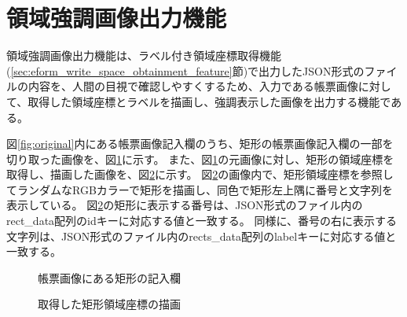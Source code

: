 \section{領域強調画像出力機能}\label{sec:highlighted_area_image_output}
領域強調画像出力機能は、ラベル付き領域座標取得機能(\ref{sec:eform_write_space_obtainment_feature}節)で出力したJSON形式のファイルの内容を、人間の目視で確認しやすくするため、入力である帳票画像に対して、取得した領域座標とラベルを描画し、強調表示した画像を出力する機能である。

図\ref{fig:original}内にある帳票画像記入欄のうち、矩形の帳票画像記入欄の一部を切り取った画像を、図\ref{fig:rect_original}に示す。
また、図\ref{fig:rect_original}の元画像に対し、矩形の領域座標を取得し、描画した画像を、図\ref{fig:rect_drawing}に示す。
図\ref{fig:rect_drawing}の画像内で、矩形領域座標を参照してランダムなRGBカラーで矩形を描画し、同色で矩形左上隅に番号と文字列を表示している。
図\ref{fig:rect_drawing}の矩形に表示する番号は、JSON形式のファイル内のrect\_data配列のidキーに対応する値と一致する。
同様に、番号の右に表示する文字列は、JSON形式のファイル内のrects\_data配列のlabelキーに対応する値と一致する。

\begin{figure}[t]
    \begin{center}
        \caption{帳票画像にある矩形の記入欄}
        \label{fig:rect_original}
    \end{center}
\end{figure}

\begin{figure}[t]
    \begin{center}
        \caption{取得した矩形領域座標の描画}
        \label{fig:rect_drawing}
    \end{center}
\end{figure}

